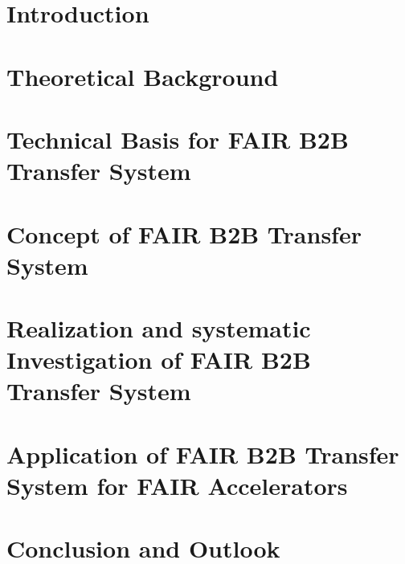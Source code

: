 \documentclass[12pt,twoside]{report}
\begin{document}



\chapter{Introduction}

\chapter{Theoretical Background}\label{background}

%
\chapter{Technical Basis for FAIR B2B Transfer System}\label{technical}

\chapter{Concept of FAIR B2B Transfer System}\label{concept}

\chapter{Realization and systematic Investigation of FAIR B2B Transfer System}\label{realization}

\chapter{Application of FAIR B2B Transfer System for FAIR Accelerators}\label{application}

%
\chapter{Conclusion and Outlook}

\end{document}
